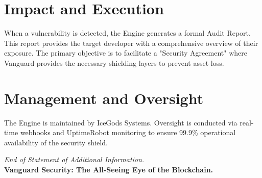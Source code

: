 \documentclass[11pt, a4paper]{article}
\begin{document}
\section{Impact and Execution}
When a vulnerability is detected, the Engine generates a formal Audit Report. This report provides the target developer with a comprehensive overview of their exposure. The primary objective is to facilitate a "Security Agreement" where Vanguard provides the necessary shielding layers to prevent asset loss.

\section{Management and Oversight}
The Engine is maintained by IceGods Systems. Oversight is conducted via real-time webhooks and UptimeRobot monitoring to ensure 99.9\% operational availability of the security shield.

\vspace{2cm}
\begin{center}
    \small \textit{End of Statement of Additional Information.} \\
    \textbf{Vanguard Security: The All-Seeing Eye of the Blockchain.}
\end{center}
\end{document}
